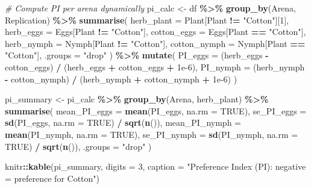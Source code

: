 \documentclass[
]{article}
\newenvironment{Shaded}{\begin{snugshade}}{\end{snugshade}}
\newcommand{\AttributeTok}[1]{\textcolor[rgb]{0.13,0.29,0.53}{#1}}
\newcommand{\CommentTok}[1]{\textcolor[rgb]{0.56,0.35,0.01}{\textit{#1}}}
\newcommand{\ConstantTok}[1]{\textcolor[rgb]{0.56,0.35,0.01}{#1}}
\newcommand{\DecValTok}[1]{\textcolor[rgb]{0.00,0.00,0.81}{#1}}
\newcommand{\FloatTok}[1]{\textcolor[rgb]{0.00,0.00,0.81}{#1}}
\newcommand{\FunctionTok}[1]{\textcolor[rgb]{0.13,0.29,0.53}{\textbf{#1}}}
\newcommand{\NormalTok}[1]{#1}
\newcommand{\OtherTok}[1]{\textcolor[rgb]{0.56,0.35,0.01}{#1}}
\newcommand{\SpecialCharTok}[1]{\textcolor[rgb]{0.81,0.36,0.00}{\textbf{#1}}}
\newcommand{\StringTok}[1]{\textcolor[rgb]{0.31,0.60,0.02}{#1}}
\begin{document}
\begin{Shaded}
\begin{Highlighting}[]
\CommentTok{\# Compute PI per arena dynamically}
\NormalTok{pi\_calc }\OtherTok{\textless{}{-}}\NormalTok{ df }\SpecialCharTok{\%\textgreater{}\%}
  \FunctionTok{group\_by}\NormalTok{(Arena, Replication) }\SpecialCharTok{\%\textgreater{}\%}
  \FunctionTok{summarise}\NormalTok{(}
    \AttributeTok{herb\_plant  =}\NormalTok{ Plant[Plant }\SpecialCharTok{!=} \StringTok{"Cotton"}\NormalTok{][}\DecValTok{1}\NormalTok{],}
    \AttributeTok{herb\_eggs   =}\NormalTok{ Eggs[Plant }\SpecialCharTok{!=} \StringTok{"Cotton"}\NormalTok{],}
    \AttributeTok{cotton\_eggs =}\NormalTok{ Eggs[Plant }\SpecialCharTok{==} \StringTok{"Cotton"}\NormalTok{],}
    \AttributeTok{herb\_nymph  =}\NormalTok{ Nymph[Plant }\SpecialCharTok{!=} \StringTok{"Cotton"}\NormalTok{],}
    \AttributeTok{cotton\_nymph =}\NormalTok{ Nymph[Plant }\SpecialCharTok{==} \StringTok{"Cotton"}\NormalTok{],}
    \AttributeTok{.groups =} \StringTok{"drop"}
\NormalTok{  ) }\SpecialCharTok{\%\textgreater{}\%}
  \FunctionTok{mutate}\NormalTok{(}
    \AttributeTok{PI\_eggs  =}\NormalTok{ (herb\_eggs  }\SpecialCharTok{{-}}\NormalTok{ cotton\_eggs)  }\SpecialCharTok{/}\NormalTok{ (herb\_eggs  }\SpecialCharTok{+}\NormalTok{ cotton\_eggs  }\SpecialCharTok{+} \FloatTok{1e{-}6}\NormalTok{),}
    \AttributeTok{PI\_nymph =}\NormalTok{ (herb\_nymph }\SpecialCharTok{{-}}\NormalTok{ cotton\_nymph) }\SpecialCharTok{/}\NormalTok{ (herb\_nymph }\SpecialCharTok{+}\NormalTok{ cotton\_nymph }\SpecialCharTok{+} \FloatTok{1e{-}6}\NormalTok{)}
\NormalTok{  )}

\NormalTok{pi\_summary }\OtherTok{\textless{}{-}}\NormalTok{ pi\_calc }\SpecialCharTok{\%\textgreater{}\%}
  \FunctionTok{group\_by}\NormalTok{(Arena, herb\_plant) }\SpecialCharTok{\%\textgreater{}\%}
  \FunctionTok{summarise}\NormalTok{(}
    \AttributeTok{mean\_PI\_eggs  =} \FunctionTok{mean}\NormalTok{(PI\_eggs,  }\AttributeTok{na.rm =} \ConstantTok{TRUE}\NormalTok{),}
    \AttributeTok{se\_PI\_eggs    =} \FunctionTok{sd}\NormalTok{(PI\_eggs,    }\AttributeTok{na.rm =} \ConstantTok{TRUE}\NormalTok{) }\SpecialCharTok{/} \FunctionTok{sqrt}\NormalTok{(}\FunctionTok{n}\NormalTok{()),}
    \AttributeTok{mean\_PI\_nymph =} \FunctionTok{mean}\NormalTok{(PI\_nymph, }\AttributeTok{na.rm =} \ConstantTok{TRUE}\NormalTok{),}
    \AttributeTok{se\_PI\_nymph   =} \FunctionTok{sd}\NormalTok{(PI\_nymph,   }\AttributeTok{na.rm =} \ConstantTok{TRUE}\NormalTok{) }\SpecialCharTok{/} \FunctionTok{sqrt}\NormalTok{(}\FunctionTok{n}\NormalTok{()),}
    \AttributeTok{.groups =} \StringTok{"drop"}
\NormalTok{  )}

\NormalTok{knitr}\SpecialCharTok{::}\FunctionTok{kable}\NormalTok{(pi\_summary, }\AttributeTok{digits =} \DecValTok{3}\NormalTok{,}
             \AttributeTok{caption =} \StringTok{"Preference Index (PI): negative = preference for Cotton"}\NormalTok{)}
\end{Highlighting}
\end{Shaded}
\end{document}
